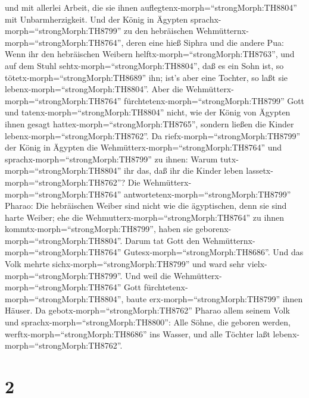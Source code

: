 und mit allerlei Arbeit, die sie ihnen
auflegtenx-morph=``strongMorph:TH8804'' mit Unbarmherzigkeit.
 Und der König in Ägypten
sprachx-morph=``strongMorph:TH8799'' zu den hebräischen
Wehmütternx-morph=``strongMorph:TH8764'', deren eine hieß Siphra und die
andere Pua:  Wenn ihr den hebräischen Weibern
helftx-morph=``strongMorph:TH8763'', und auf dem Stuhl
sehtx-morph=``strongMorph:TH8804'', daß es ein Sohn ist, so
tötetx-morph=``strongMorph:TH8689'' ihn; ist's aber eine Tochter, so
laßt sie lebenx-morph=``strongMorph:TH8804''.  Aber die
Wehmütterx-morph=``strongMorph:TH8764''
fürchtetenx-morph=``strongMorph:TH8799'' Gott und
tatenx-morph=``strongMorph:TH8804'' nicht, wie der König von Ägypten
ihnen gesagt hattex-morph=``strongMorph:TH8765'', sondern ließen die
Kinder lebenx-morph=``strongMorph:TH8762''.  Da
riefx-morph=``strongMorph:TH8799'' der König in Ägypten die
Wehmütterx-morph=``strongMorph:TH8764'' und
sprachx-morph=``strongMorph:TH8799'' zu ihnen: Warum
tutx-morph=``strongMorph:TH8804'' ihr das, daß ihr die Kinder leben
lassetx-morph=``strongMorph:TH8762''?  Die
Wehmütterx-morph=``strongMorph:TH8764''
antwortetenx-morph=``strongMorph:TH8799'' Pharao: Die hebräischen Weiber
sind nicht wie die ägyptischen, denn sie sind harte Weiber; ehe die
Wehmutterx-morph=``strongMorph:TH8764'' zu ihnen
kommtx-morph=``strongMorph:TH8799'', haben sie
geborenx-morph=``strongMorph:TH8804''.  Darum tat Gott den
Wehmütternx-morph=``strongMorph:TH8764''
Gutesx-morph=``strongMorph:TH8686''. Und das Volk mehrte
sichx-morph=``strongMorph:TH8799'' und ward sehr
vielx-morph=``strongMorph:TH8799''.  Und weil die
Wehmütterx-morph=``strongMorph:TH8764'' Gott
fürchtetenx-morph=``strongMorph:TH8804'', baute
erx-morph=``strongMorph:TH8799'' ihnen Häuser.  Da
gebotx-morph=``strongMorph:TH8762'' Pharao allem seinem Volk und
sprachx-morph=``strongMorph:TH8800'': Alle Söhne, die geboren werden,
werftx-morph=``strongMorph:TH8686'' ins Wasser, und alle Töchter laßt
lebenx-morph=``strongMorph:TH8762''.

\hypertarget{section-1}{%
\section{2}\label{section-1}}

